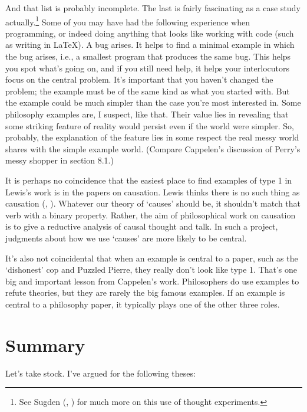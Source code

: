 \documentclass[
  10pt,
  letterpaper,
  DIV=11,
  numbers=noendperiod,
  twoside]{scrartcl}
\begin{document}
And that list is probably incomplete. The last is fairly fascinating as
a case study actually.\footnote{See Sugden
  (, ) for
  much more on this use of thought experiments.} Some of you may have
had the following experience when programming, or indeed doing anything
that looks like working with code (such as writing in LaTeX). A bug
arises. It helps to find a minimal example in which the bug arises,
i.e., a smallest program that produces the same bug. This helps you spot
what's going on, and if you still need help, it helps your interlocutors
focus on the central problem. It's important that you haven't changed
the problem; the example must be of the same kind as what you started
with. But the example could be much simpler than the case you're most
interested in. Some philosophy examples are, I suspect, like that. Their
value lies in revealing that some striking feature of reality would
persist even if the world were simpler. So, probably, the explanation of
the feature lies in some respect the real messy world shares with the
simple example world. (Compare Cappelen's discussion of Perry's messy
shopper in section 8.1.)

It is perhaps no coincidence that the easiest place to find examples of
type 1 in Lewis's work is in the papers on causation. Lewis thinks there
is no such thing as causation (,
). Whatever our theory of `causes'
should be, it shouldn't match that verb with a binary property. Rather,
the aim of philosophical work on causation is to give a reductive
analysis of causal thought and talk. In such a project, judgments about
how we use `causes' are more likely to be central.

It's also not coincidental that when an example is central to a paper,
such as the `dishonest' cop and Puzzled Pierre, they really don't look
like type 1. That's one big and important lesson from Cappelen's work.
Philosophers do use examples to refute theories, but they are rarely the
big famous examples. If an example is central to a philosophy paper, it
typically plays one of the other three roles.

\section{Summary}\label{sec-Summary}

Let's take stock. I've argued for the following theses:
\end{document}

